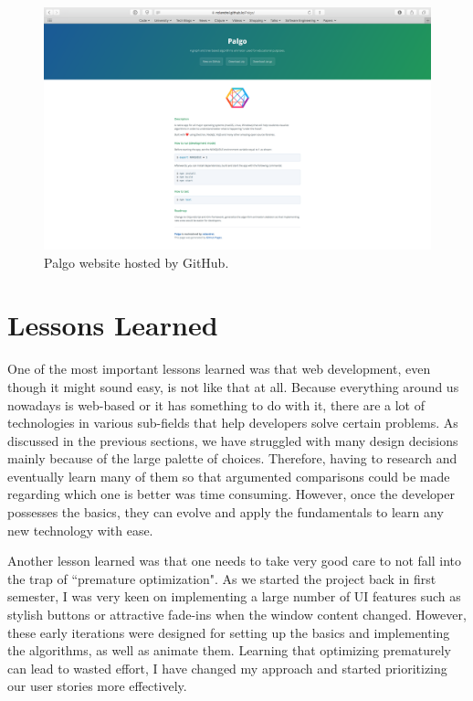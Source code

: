 \documentclass{l4proj}
\begin{document}
\begin{figure}[!ht]
\centering
\includegraphics[scale=0.3]{palgo-website}
\caption{Palgo website hosted by GitHub.}
\label{fig:palgo-website}
\end{figure}

\section{Lessons Learned}

One of the most important lessons learned was that web development, even though it might sound easy, is not like that at all.
Because everything around us nowadays is web-based or it has something to do with it, there are a lot of technologies in
various sub-fields that help developers solve certain problems. As discussed in the previous sections, we have struggled
with many design decisions mainly because of the large palette of choices. Therefore, having to research and eventually
learn many of them so that argumented comparisons could be made regarding which one is better was time consuming.
However, once the developer possesses the basics, they can evolve and apply the fundamentals to learn any new
technology with ease.

Another lesson learned was that one needs to take very good care to not fall into the trap of ``premature optimization".
As we started the project back in first semester, I was very keen on implementing a large number of UI features such as
stylish buttons or attractive fade-ins when the window content changed. However, these early iterations were designed
for setting up the basics and implementing the algorithms, as well as animate them. Learning that optimizing prematurely
can lead to wasted effort, I have changed my approach and started prioritizing our user stories more effectively.
\end{document}
